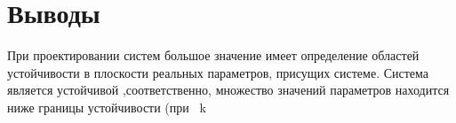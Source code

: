 \documentclass[a4paper, 11pt] {article}
\begin{document}
\section*{Выводы}
При проектировании систем большое значение имеет определение областей устойчивости в плоскости реальных параметров, присущих системе. Система является устойчивой ,соответственно, множество значений параметров находится ниже границы устойчивости (при %
\ k \le {}\)
\end{document}
